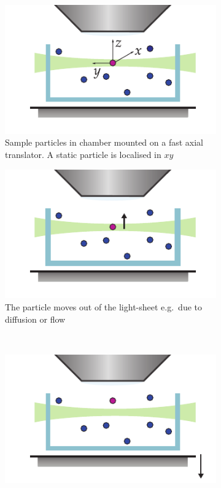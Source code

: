 \begin{figure}
	\centering
	\begin{subfigure}[t]{0.45\linewidth}
		\centering
		\includegraphics{Chapters/spt/Figs/PDF/tracking/1_piezo_track}
		\caption{Sample particles in chamber mounted on a fast axial translator. A static particle is localised in \(xy\)}\label{fig:SPIMSPT1}
	\end{subfigure}\quad
	\begin{subfigure}[t]{0.45\linewidth}
		\centering
		\includegraphics{Chapters/spt/Figs/PDF/tracking/2_piezo_track}
		\caption{The particle moves out of the light-sheet e.g.~due to diffusion or flow}\label{fig:SPIMSPT2}
	\end{subfigure}
    \\\vspace{\abovecaptionskip}
	\begin{subfigure}[t]{0.45\linewidth}
		\centering
		\includegraphics{Chapters/spt/Figs/PDF/tracking/3_piezo_track}

\end{subfigure}
\end{figure}
